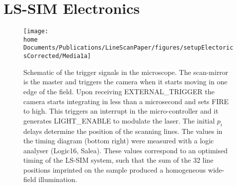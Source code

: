 \chapter{LS-SIM Electronics\label{app:LSSIM electronics}}
%
\begin{figure}[!hbt]
	\centering
	\newcommand{\wf}{.8\textwidth}
	\texttt{[image: \\home Documents/Publications/LineScanPaper/figures/setupElectoricsCorrected/Media1a]}
	\caption{Schematic of the trigger signals in the microscope. The scan-mirror is the master and triggers the camera when it starts moving in one edge of the field. Upon receiving {\sf EXTERNAL\_TRIGGER} the camera starts integrating in less than a microsecond and sets {\sf FIRE} to high. This triggers an interrupt in the micro-controller and it generates {\sf LIGHT\_ENABLE} to modulate the laser. The initial $p_i$ delays determine the position of the scanning lines.
The values in the timing diagram (bottom right) were measured with a logic analyser (Logic16, Salea). These values correspond to an optimised timing of the LS-SIM system, such that the sum of the 32 line positions imprinted on the sample produced a homogeneous wide-field illumination.} 
\end{figure}

